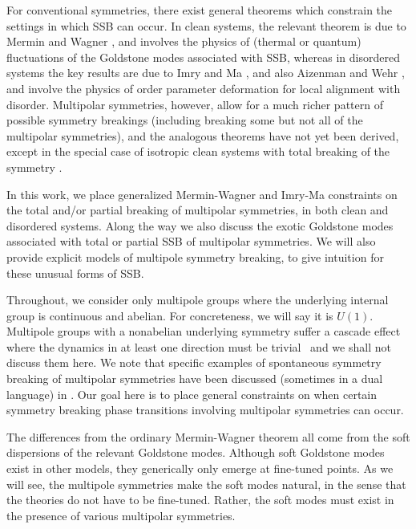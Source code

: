 \documentclass[prb,aps,twocolumn, amsfonts,amsmath,amssymb,nofootinbib,superscriptaddress]{revtex4-2}
\begin{document}
For conventional symmetries, there exist general theorems which constrain the settings in which SSB can occur. In clean systems, the relevant theorem is due to Mermin and Wagner \cite{MerminWagner}, and involves the physics of (thermal or quantum) fluctuations of the Goldstone modes associated with SSB, whereas in disordered systems the key results are due to Imry and Ma \cite{ImryMa, Vojta2013}, and also Aizenman and Wehr \cite{Aizenman}, and involve the physics of order parameter deformation for local alignment with disorder. Multipolar symmetries, however, allow for a much richer pattern of possible symmetry breakings (including breaking some but not all of the multipolar symmetries), and the analogous theorems have not yet been derived, except in the special case of isotropic clean systems with total breaking of the symmetry \cite{Griffin2013Multi}.

In this work, we place generalized Mermin-Wagner and Imry-Ma constraints on the total and/or partial breaking of multipolar symmetries, in both clean and disordered systems. Along the way we also discuss the exotic Goldstone modes associated with total or partial SSB of multipolar symmetries. We will also provide explicit models of multipole symmetry breaking, to give intuition for these unusual forms of SSB. 

Throughout, we consider only multipole groups where the underlying internal group is continuous and abelian. For concreteness, we will say it is $U(1)$. Multipole groups with a nonabelian underlying symmetry suffer a cascade effect where the dynamics in at least one direction must be trivial~\cite{nonabelian} and we shall not discuss them here. We note that specific examples of spontaneous symmetry breaking of multipolar symmetries have been discussed (sometimes in a dual language) in \cite{elastic1, elastic2, elastic3, elastic4, elastic5, FS1, FS2}. Our goal here is to place general constraints on when certain symmetry breaking phase transitions involving multipolar symmetries can occur. 

The differences from the ordinary Mermin-Wagner theorem all come from the soft dispersions of the relevant Goldstone modes. Although soft Goldstone modes exist in other models, they generically only emerge at fine-tuned points. As we will see, the multipole symmetries make the soft modes natural, in the sense that the theories do not have to be fine-tuned. Rather, the soft modes must exist in the presence of various multipolar symmetries.
\end{document}
